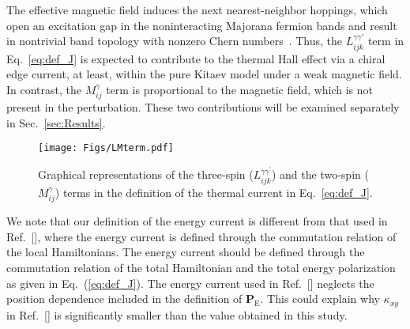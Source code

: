 \documentclass[twocolumn,superscriptaddress,showpacs, longbibliography, aps, prx]{revtex4-2}
\def\vec#1{\boldsymbol #1}
\begin{document}
The effective magnetic field induces the next nearest-neighbor hoppings, which open an excitation gap in the noninteracting Majorana fermion bands and result in nontrivial band topology with nonzero Chern numbers~\cite{Kitaev2006}.
Thus, the $L_{ijk}^{\gamma\gamma'}$ term in Eq.~\eqref{eq:def_J} is expected to contribute to the thermal Hall effect via a chiral edge current, at least, within the pure Kitaev model under a weak magnetic field. 
In contrast, the $M_{ij}^{\gamma}$ term is proportional to the magnetic field, which is not present in the perturbation. 
These two contributions will be examined separately in Sec.~\ref{sec:Results}.

\begin{figure}
  \begin{center}
    \texttt{[image: Figs/LMterm.pdf]}    
  \end{center}
  \caption{
  Graphical representations of the three-spin ($L_{ijk}^{\gamma\gamma^\prime}$) and the two-spin ($M_{ij}^\gamma$) terms in the definition of the thermal current in Eq.~\eqref{eq:def_J}.
  }
  \label{fig:LM_term}
\end{figure}


We note that our definition of the energy current is different from that used in Ref.~[], where the energy current is defined through the commutation relation of the local Hamiltonians.
The energy current should be defined through the commutation relation of the total Hamiltonian and the total energy polarization as given in Eq.~(\ref{eq:def_J}). 
The energy current used in Ref.~[] neglects the position dependence included in the definition of $\vec{P}_{\mathrm{E}}$.
This could explain why $\kappa_{xy}$ in Ref.~[] is significantly smaller than the value obtained in this study.
\end{document}

